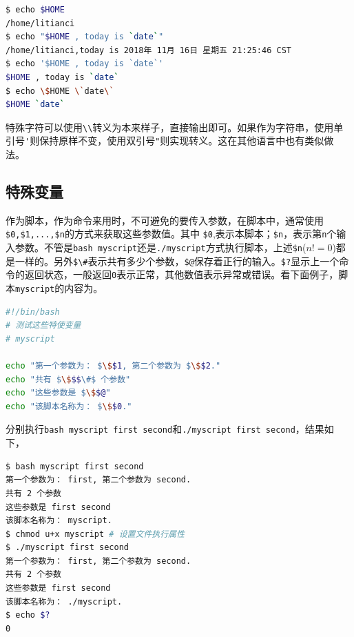 \documentclass[doctor,openright,twoside]{sjtuthesis}
\newcommand{\passthrough}[1]{#1}
\theoremstyle{plain}
\theoremstyle{definition}
\theoremstyle{remark}
\theoremstyle{ocrenumbox}
\theoremstyle{plain}
\begin{document}
\begin{lstlisting}[language=bash]
$ echo $HOME
/home/litianci
$ echo "$HOME , today is `date`"
/home/litianci,today is 2018年 11月 16日 星期五 21:25:46 CST
$ echo '$HOME , today is `date`'
$HOME , today is `date`
$ echo \$HOME \`date\`
$HOME `date`
\end{lstlisting}

特殊字符可以使用\passthrough{\lstinline!\\!}转义为本来样子，直接输出即可。如果作为字符串，使用单引号\passthrough{\lstinline!'!}则保持原样不变，使用双引号\passthrough{\lstinline!"!}则实现转义。这在其他语言中也有类似做法。

\hypertarget{section-103}{%
\subsection{特殊变量}\label{section-103}}

作为脚本，作为命令来用时，不可避免的要传入参数，在脚本中，通常使用\passthrough{\lstinline!$0,$1,...,$n!}的方式来获取这些参数值。其中 \passthrough{\lstinline!$0!},表示本脚本；\passthrough{\lstinline!$n!}，表示第\passthrough{\lstinline!n!}个输入参数。不管是\passthrough{\lstinline!bash myscript!}还是\passthrough{\lstinline!./myscript!}方式执行脚本，上述\passthrough{\lstinline!$n!}(\(n!=0\))都是一样的。另外\passthrough{\lstinline!$\#!}表示共有多少个参数，\passthrough{\lstinline!$@!}保存着正行的输入。\passthrough{\lstinline!$?!}显示上一个命令的返回状态，一般返回\passthrough{\lstinline!0!}表示正常，其他数值表示异常或错误。看下面例子，脚本\passthrough{\lstinline!myscript!}的内容为。
\lstset{mathescape=true}

\begin{lstlisting}[language=bash]
#!/bin/bash
# 测试这些特使变量
# myscript

echo "第一个参数为： $\$$1, 第二个参数为 $\$$2."
echo "共有 $\$$$\#$ 个参数"
echo "这些参数是 $\$$@"
echo "该脚本名称为： $\$$0."
\end{lstlisting}

\lstset{mathescape=false}

分别执行\passthrough{\lstinline!bash myscript first second!}和\passthrough{\lstinline!./myscript first second!}，结果如下，

\begin{lstlisting}[language=bash]
$ bash myscript first second
第一个参数为： first, 第二个参数为 second.
共有 2 个参数
这些参数是 first second
该脚本名称为： myscript.
$ chmod u+x myscript # 设置文件执行属性
$ ./myscript first second
第一个参数为： first, 第二个参数为 second.
共有 2 个参数
这些参数是 first second
该脚本名称为： ./myscript.
$ echo $?
0
\end{lstlisting}
\end{document}
